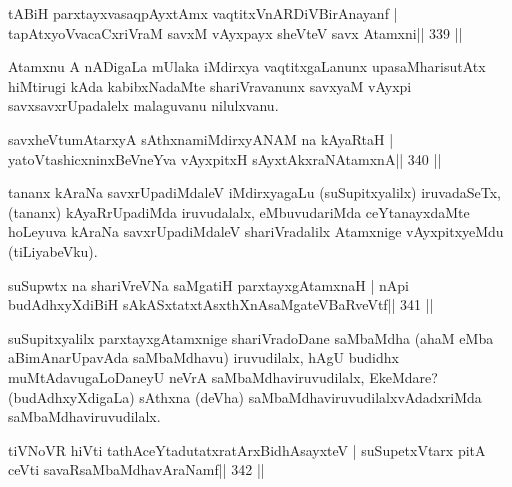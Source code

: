\begin{shl}
tABiH parxtayxvasaqpAyx\s\s tAmx vaqtitxVnARDiVBirAnayanf |
\footnotemark[1]tapAtxyoVvacaCxriVraM savxM vAyxpayx sheVteV savx Atamxni\hfill || 339 ||
\end{shl}

\begin{artha}
Atamxnu A nADigaLa mUlaka iMdirxya vaqtitxgaLanunx upasaMharisutAtx  hiMtirugi kAda kabibxNadaMte shariVravanunx savxyaM vAyxpi savxsavxrUpadalelx malaguvanu nilulxvanu.
\end{artha}


\begin{shl}
savxheVtumAtarxyA sAthxnamiMdirxyANAM na kAyaRtaH |
yatoV\s tashicxninxBeVneYva vAyxpitxH sAyxtAkxraNAtamxnA\hfill || 340 ||
\end{shl}

\begin{artha}
tananx kAraNa savxrUpadiMdaleV iMdirxyagaLu (suSupitxyalilx)  iruvadaSeTx, (tananx) kAyaRrUpadiMda iruvudalalx, eMbuvudariMda ceYtanayxdaMte hoLeyuva kAraNa savxrUpadiMdaleV shariVradalilx Atamxnige vAyxpitxyeMdu (tiLiyabeVku).
\end{artha}


\begin{shl}
suSupwtx na shariVreVNa saMgatiH parxtayxgAtamxnaH |
nApi budAdhxyXdiBiH sAkASxtatxtAsxthXnAsaMgateVBaRveVtf\hfill || 341 ||
\end{shl}

\begin{artha}
suSupitxyalilx parxtayxgAtamxnige shariVradoDane saMbaMdha (ahaM eMba  aBimAna\-rUpavAda saMbaMdhavu) iruvudilalx, hAgU budidhx  muMtAdavugaLoDaneyU neVrA saMbaMdhaviruvudilalx, EkeMdare? (budAdhxyXdigaLa) sAthxna (deVha) saMbaMdhaviruvudilalxvAdadxriMda saMbaMdhaviruvudilalx.
\end{artha}


\begin{shl}
tiVNoVR hiVti tathAceYtadutatxratArxBidhAsayxteV |
suSupetxV\s tarx pitA ceVti savaRsaMbaMdhavAraNamf\hfill || 342 ||
\end{shl}


